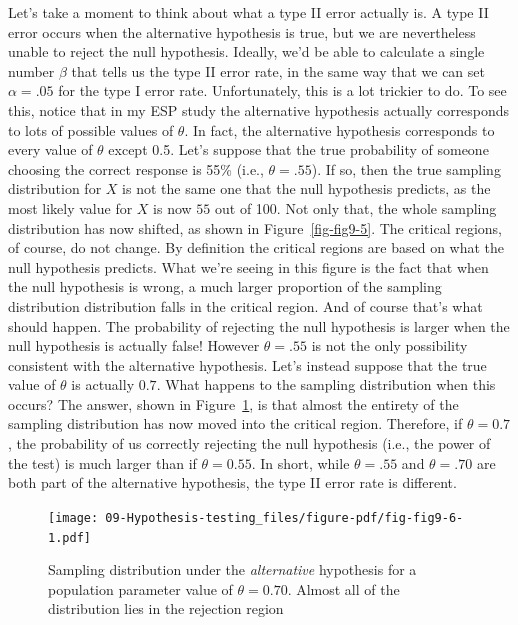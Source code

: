 \documentclass[
  a4paper,
]{book}
\begin{document}
Let's take a moment to think about what a type II error actually is. A
type II error occurs when the alternative hypothesis is true, but we are
nevertheless unable to reject the null hypothesis. Ideally, we'd be able
to calculate a single number \(\beta\) that tells us the type II error
rate, in the same way that we can set \(\alpha = .05\) for the type I
error rate. Unfortunately, this is a lot trickier to do. To see this,
notice that in my ESP study the alternative hypothesis actually
corresponds to lots of possible values of \(\theta\). In fact, the
alternative hypothesis corresponds to every value of \(\theta\) except
0.5. Let's suppose that the true probability of someone choosing the
correct response is 55\% (i.e., \(\theta = .55\)). If so, then the true
sampling distribution for \(X\) is not the same one that the null
hypothesis predicts, as the most likely value for \(X\) is now \(55\)
out of 100. Not only that, the whole sampling distribution has now
shifted, as shown in Figure~\ref{fig-fig9-5}. The critical regions, of
course, do not change. By definition the critical regions are based on
what the null hypothesis predicts. What we're seeing in this figure is
the fact that when the null hypothesis is wrong, a much larger
proportion of the sampling distribution distribution falls in the
critical region. And of course that's what should happen. The
probability of rejecting the null hypothesis is larger when the null
hypothesis is actually false! However \(\theta = .55\) is not the only
possibility consistent with the alternative hypothesis. Let's instead
suppose that the true value of \(\theta\) is actually \(0.7\). What
happens to the sampling distribution when this occurs? The answer, shown
in Figure~\ref{fig-fig9-6}, is that almost the entirety of the sampling
distribution has now moved into the critical region. Therefore, if
\(\theta = 0.7\), the probability of us correctly rejecting the null
hypothesis (i.e., the power of the test) is much larger than if
\(\theta = 0.55\). In short, while \(\theta = .55\) and \(\theta = .70\)
are both part of the alternative hypothesis, the type II error rate is
different.

\begin{figure}

\texttt{[image: 09-Hypothesis-testing\_files/figure-pdf/fig-fig9-6-1.pdf]} \hfill{}

\caption{\label{fig-fig9-6}Sampling distribution under the
\emph{alternative} hypothesis for a population parameter value of
\(\theta = 0.70\). Almost all of the distribution lies in the rejection
region}

\end{figure}
\end{document}
